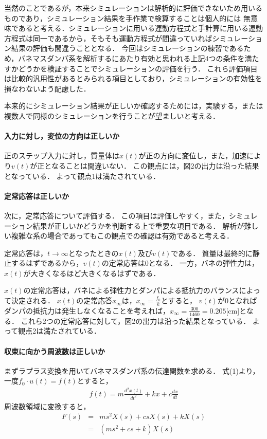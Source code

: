 \documentclass[dvipdfmx,titlepage,a4j]{jsarticle}  %
\begin{document}
当然のことであるが，本来シミュレーションは解析的に評価できないため用いるものであり，シミュレーション結果を手作業で検算することは個人的には
無意味であると考える．シミュレーションに用いる運動方程式と手計算に用いる運動方程式は同一であるから，そもそも運動方程式が間違っていればシミュレーション結果の評価も間違うこととなる．
今回はシミュレーションの練習であるため，バネマスダンパ系を解析するにあたり有効と思われる上記4つの条件を満たすかどうかを検証することでシミュレーションの評価を行う．
これら評価項目は比較的汎用性があるとみられる項目としており，シミュレーションの有効性を損なわないよう配慮した．

本来的にシミュレーション結果が正しいか確認するためには，実験する，または複数人で同様のシミュレーションを行うことが望ましいと考える．

\paragraph{入力に対し，変位の方向は正しいか\\}
正のステップ入力に対し，質量体は$x(t)$が正の方向に変位し，また，加速により$v(t)$が正となることは間違いない．
この観点には，図2の出力は沿った結果となっている．
よって観点1は満たされている．

\paragraph{定常応答は正しいか\\}
次に，定常応答について評価する．
この項目は評価しやすく，また，シミュレーション結果が正しいかどうかを判断する上で重要な項目である．
解析が難しい複雑な系の場合であってもこの観点での確認は有効であると考える．

定常応答は，$t \rightarrow \infty$となったときの$x(t)$及び$v(t)$である．
質量は最終的に静止するはずであるから，$v(t)$の定常応答は0となる．
一方，バネの弾性力は，$x(t)$が大きくなるほど大きくなるはずである．

$x(t)$の定常応答は，バネによる弾性力とダンパによる抵抗力のバランスによって決定される．
$x(t)$の定常応答$x_\infty$は，$x_\infty = \frac{f_0}{k}$とすると，
$v(t)$が0となればダンパの抵抗力は発生しなくなることを考えれば，$x_\infty = \frac{300}{1460} = 0.205$[cm]となる．
これら2つの定常応答に対して，図2の出力は沿った結果となっている．
よって観点2は満たされている．

\paragraph{収束に向かう周波数は正しいか\\}
まずラプラス変換を用いてバネマスダンパ系の伝達関数を求める．
式(1)より，一度$f_0 \cdot u(t) = f(t)$とすると，
\begin{eqnarray}
  f(t) = m \frac{d^2x(t)}{dt^2} + kx + c \frac{dx}{dt} \nonumber
\end{eqnarray}
周波数領域に変換すると，
\begin{eqnarray}
  F(s) &=& m s^2 X(s)  + c s X(s) + k X(s) \nonumber \\ \nonumber
  &=& (m s^2 + c s + k) X(s)
\end{eqnarray}
\end{document}

